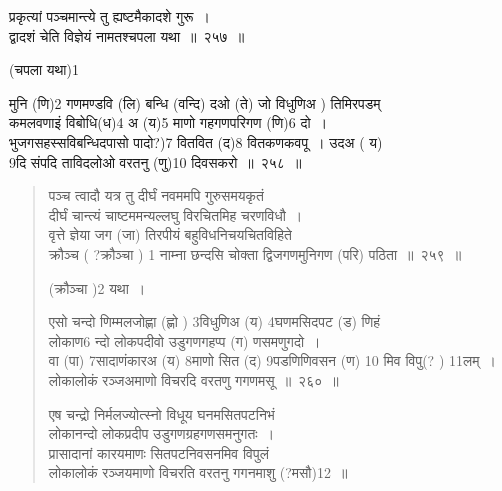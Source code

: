 \documentclass[11pt, openany]{book}
\begin{document}
{\na प्रकृत्यां पञ्चमान्त्ये तु ह्यष्टमैकादशे गुरू~। \\
द्वादशं चेति विज्ञेयं नामतश्चपला यथा~॥~२५७~॥}

(चपला यथा)1

{\na मुनि (णि)2 गणमण्डवि (लि) बन्धि (वन्दि) दओ (ते) जो विधुणिअ ) तिमिरपडम् \\
कमलवणाइं विबोधि(ध)4 अ (य)5 माणो गहगणपरिगण (णि)6 दो~।\\
भुजगसहस्सविबन्धिदपासो पादो?)7 वितवित (द)8 वितकणकवपू~। उदअ ( य)\\
9दि संपदि ताविदलोओ वरतनु (णु)10 दिवसकरो~॥~२५८~॥}

{ }


\newpage

\begin{quote}
{\na पञ्च त्वादौ यत्र तु दीर्घं नवममपि गुरुसमयकृतं \\
दीर्घं चान्त्यं चाष्टममन्यल्लघु विरचितमिह चरणविधौ~। \\
वृत्ते ज्ञेया जग (जा) तिरपीयं बहुविधनिचयचितविहिते \\
क्रौञ्च ( ?क्रौञ्चा ) 1 नाम्ना छन्दसि चोक्ता द्विजगणमुनिगण (परि) पठिता~॥~२५९~॥}

(क्रौञ्चा )2 यथा~।

{\na एसो चन्दो णिम्मलजोह्णा (ह्णो ) 3विधुणिअ (य) 4घणमसिदपट (ड) णिहं\\
लोकाण6 न्दो लोकपदीवो उडुगणगहप्प (ग) णसमणुगदो~।\\
वा (पा) 7सादाणंकारअ (य) 8माणो सित (द) 9पडणिणिवसन (ण) 10 मिव विपु(? ) 11लम्~।\\
लोकालोकं रञ्जअमाणो विचरदि वरतणु गगणमसू~॥~२६०~॥}

{\na एष चन्द्रो निर्मलज्योत्स्नो विधूय घनमसितपटनिभं \\
लोकानन्दो लोकप्रदीप उडुगणग्रहगणसमनुगतः~। \\
प्रासादानां कारयमाणः सितपटनिवसनमिव विपुलं\\
लोकालोकं रञ्जयमाणो विचरति वरतनु गगनमाशु (?मसौ)12~॥}
\end{quote}


\newpage
\end{document}
